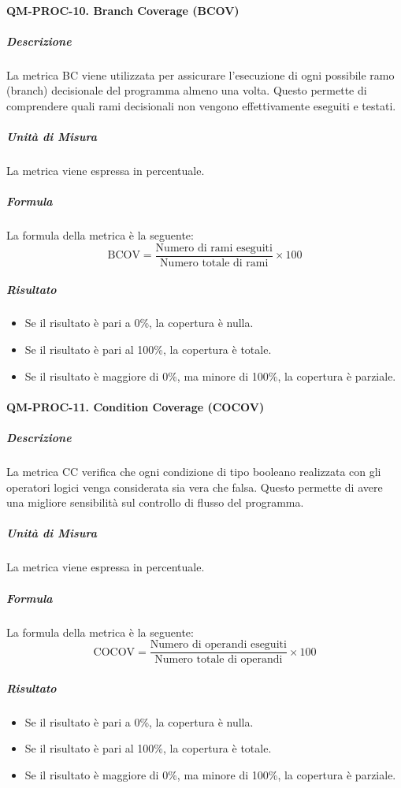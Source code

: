 		\paragraph{QM-PROC-10. Branch Coverage (BCOV)}

			\subparagraph{Descrizione}
			La metrica BC viene utilizzata per assicurare l'esecuzione di ogni possibile ramo (branch) decisionale del programma almeno una volta. Questo permette di comprendere quali rami decisionali non vengono effettivamente eseguiti e testati.

			\subparagraph{Unità di Misura}
			La metrica viene espressa in percentuale.

			\subparagraph{Formula}
			La formula della metrica è la seguente:
			\[
				\text{BCOV} = \frac{\text{Numero di rami eseguiti}}{\text{Numero totale di rami}} \times 100
			\]

			\subparagraph{Risultato}
			\begin{itemize}
				\item Se il risultato è pari a 0\%, la copertura è nulla.
				\item Se il risultato è pari al 100\%, la copertura è totale.
				\item Se il risultato è maggiore di 0\%, ma minore di 100\%, la copertura è parziale.
			\end{itemize}

		\paragraph{QM-PROC-11. Condition Coverage (COCOV)}

			\subparagraph{Descrizione}
			La metrica CC verifica che ogni condizione di tipo booleano realizzata con gli operatori logici venga considerata sia vera che falsa. Questo permette di avere una migliore sensibilità sul controllo di flusso del programma.

			\subparagraph{Unità di Misura}
			La metrica viene espressa in percentuale.

			\subparagraph{Formula}
			La formula della metrica è la seguente:
			\[
				\text{COCOV} = \frac{\text{Numero di operandi eseguiti}}{\text{Numero totale di operandi}} \times 100
			\]

			\subparagraph{Risultato}
			\begin{itemize}
				\item Se il risultato è pari a 0\%, la copertura è nulla.
				\item Se il risultato è pari al 100\%, la copertura è totale.
				\item Se il risultato è maggiore di 0\%, ma minore di 100\%, la copertura è parziale.
			\end{itemize}

